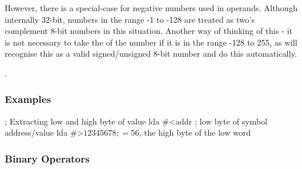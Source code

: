 However, there is a special-case for negative numbers used in operands. Although internally 32-bit, numbers in the range -1 to -128 are treated as two's complement 8-bit numbers in this situation. Another way of thinking of this - it is not necessary to take the  of the number if it is in the range -128 to 255, as \dasm will recognise this as a valid signed/unsigned 8-bit number and do this automatically.

\label{changelog:20200824rangebug}
.

\subsubsection{Examples}


\begin{code}
; Extracting low and high byte of value
  lda #<addr        ; low byte of symbol address/value
  lda #>$12345678   ; =  $56, the high byte of the low word
\end{code}



\subsubsection{Binary Operators}

